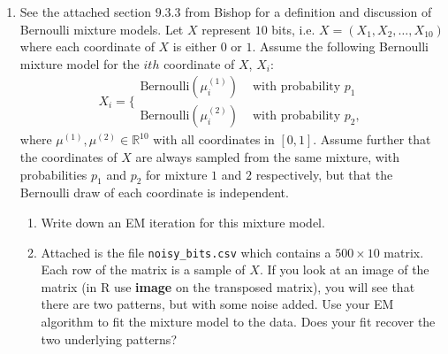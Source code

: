 \documentclass{article}
\begin{document}
\begin{enumerate}
\item See the attached section $9.3.3$ from Bishop for a definition and discussion of Bernoulli mixture models.  Let $X$ represent $10$ bits, i.e. $X = (X_1, X_2, \dots, X_{10})$ where each coordinate of $X$ is either $0$ or $1$.  Assume the following Bernoulli mixture model for the $ith$ coordinate of $X$, $X_i$:
\begin{equation}
X_i = \bigg\{
\begin{array}{cc}
\text{Bernoulli}(\mu^{(1)}_i) & \text{ with probability } p_1 \\
\text{Bernoulli}(\mu^{(2)}_i) & \text{ with probability } p_2,
\end{array}
\end{equation}
where $\mu^{(1)}, \mu^{(2)} \in \mathbb{R}^{10}$ with all coordinates in $[0,1]$.  Assume further that the coordinates of $X$ are always sampled from the same mixture, with probabilities $p_1$ and $p_2$ for mixture $1$ and $2$ respectively, but that the Bernoulli draw of each coordinate is independent.  
\begin{enumerate}
\item Write down an EM iteration for this mixture model.  
\item Attached is the file \verb+noisy_bits.csv+ which contains a $500 \times 10$ matrix.  Each row of the matrix is a sample of $X$.   If you look at an image of the matrix (in R use \textbf{image} on the transposed matrix), you will see that there are two patterns, but with some noise added.   Use your EM algorithm to fit the mixture model to the data.  Does your fit recover the two underlying patterns?
\end{enumerate}


\end{enumerate}
\end{document}
